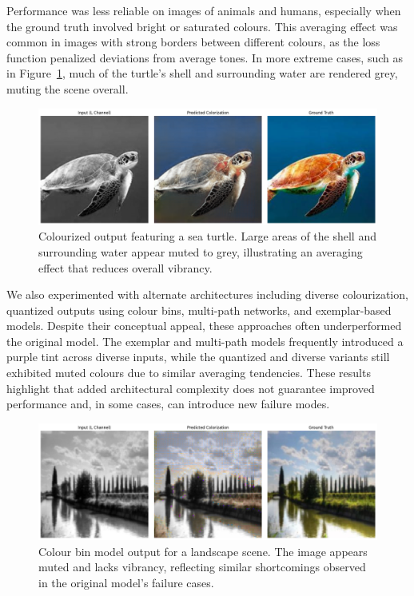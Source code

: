 \documentclass{article} %
\begin{document}
Performance was less reliable on images of animals and humans, especially when the ground truth involved bright or saturated colours. This averaging effect was common in images 
with strong borders between different colours, as the loss function penalized deviations from average tones. In more extreme cases, such as in Figure~\ref{fig:final-model-turtle}, 
much of the turtle's shell and surrounding water are rendered grey, muting the scene overall.

\begin{figure}[htbp]
  \centering
  \includegraphics[width=0.9\linewidth]{Figs/turtle-result-example.png}
  \caption{Colourized output featuring a sea turtle. Large areas of the shell and surrounding water appear muted to grey, illustrating an averaging effect that reduces overall vibrancy.}
  \label{fig:final-model-turtle}
\end{figure}

We also experimented with alternate architectures including diverse colourization, quantized outputs using colour bins, multi-path networks, and exemplar-based models. Despite their 
conceptual appeal, these approaches often underperformed the original model. The exemplar and multi-path models frequently introduced a purple tint across diverse inputs, while the 
quantized and diverse variants still exhibited muted colours due to similar averaging tendencies. These results highlight that added architectural complexity does not guarantee improved 
performance and, in some cases, can introduce new  failure modes.

\begin{figure}[htbp]
  \centering
  \includegraphics[width=0.9\linewidth]{Figs/colour-bins-landscape.jpg}
  \caption{Colour bin model output for a landscape scene. The image appears muted and lacks vibrancy, reflecting similar shortcomings observed in the original model's failure cases.}
  \label{fig:colour-bins-landscape}
\end{figure}
\end{document}
